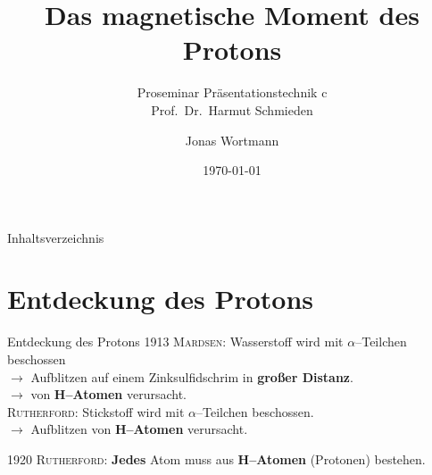 \documentclass[t,9pt]{beamer}
\title[\thesection]{Das magnetische Moment des Protons}
\subtitle{Proseminar Präsentationstechnik c \\\tiny Prof.\ Dr.\ Harmut Schmieden}
\author{Jonas Wortmann}
\institute{Universität Bonn}
\date{\today}
\begin{document}
        \begin{frame}
                \titlepage
        \end{frame}

        \begin{frame}{Inhaltsverzeichnis}
                \tableofcontents[pausesections]
        \end{frame}

        \section{Entdeckung des Protons}
        \begin{frame}{Entdeckung des Protons}
                \pause
                1913 \textsc{Mardsen}: Wasserstoff wird mit $\alpha $--Teilchen beschossen
                \\\vspace{.1cm} $\rightarrow $ Aufblitzen auf einem Zinksulfidschrim in \textbf{großer Distanz}.
                \\ $\rightarrow $ von \textbf{H--Atomen} verursacht.\cite{Rutherford_proton_discovery}
                \pause
                \\\vspace{.5cm} \textsc{Rutherford}: Stickstoff wird mit $\alpha $--Teilchen beschossen.
                \\\vspace{.1cm} $\rightarrow $ Aufblitzen von \textbf{H--Atomen} verursacht.
                \pause
                \begin{center}
                \end{center}
                \pause
                \vspace{.5cm}1920 \textsc{Rutherford}: \textbf{Jedes} Atom muss aus \textbf{H--Atomen} (Protonen) bestehen.
        \end{frame}
\end{document}
